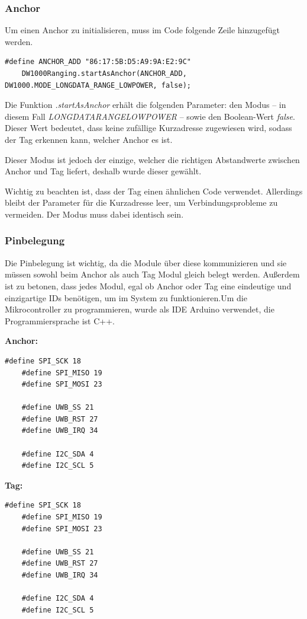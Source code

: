 \subsubsection{Anchor}

Um einen Anchor zu initialisieren, muss im Code folgende Zeile hinzugefügt werden.
\begin{lstlisting}[style=C++, caption=Anchor Initialisierung, captionpos=b]
	#define ANCHOR_ADD "86:17:5B:D5:A9:9A:E2:9C"
	DW1000Ranging.startAsAnchor(ANCHOR_ADD, DW1000.MODE_LONGDATA_RANGE_LOWPOWER, false);
\end{lstlisting} 

Die Funktion \textit{.startAsAnchor} erhält die folgenden Parameter: den Modus – in diesem Fall \textit{LONGDATA\textunderscore RANGE\textunderscore LOWPOWER} – sowie den Boolean-Wert \textit{false}. Dieser Wert bedeutet, dass keine zufällige Kurzadresse zugewiesen wird, sodass der Tag erkennen kann, welcher Anchor es ist.

Dieser Modus ist jedoch der einzige, welcher die richtigen Abstandwerte zwischen Anchor und Tag liefert, deshalb wurde dieser gewählt.

Wichtig zu beachten ist, dass der Tag einen ähnlichen Code verwendet. Allerdings bleibt der Parameter für die Kurzadresse leer, um Verbindungsprobleme zu vermeiden. Der Modus muss dabei identisch sein.

\newpage
\subsubsection{Pinbelegung}

Die Pinbelegung ist wichtig, da die Module über diese kommunizieren und sie müssen sowohl beim Anchor als auch Tag Modul gleich belegt werden. Außerdem ist zu betonen, dass jedes Modul, egal ob Anchor oder Tag eine eindeutige und einzigartige IDs benötigen, um im System zu funktionieren.Um die Mikrocontroller zu programmieren, wurde als IDE Arduino verwendet, die Programmiersprache ist C++.

\textbf{Anchor:}
\begin{lstlisting}[style=C++, caption=Pinbelegung für Anchor, captionpos=b]
	#define SPI_SCK 18
	#define SPI_MISO 19
	#define SPI_MOSI 23
	
	#define UWB_SS 21
	#define UWB_RST 27
	#define UWB_IRQ 34 
	
	#define I2C_SDA 4
	#define I2C_SCL 5
\end{lstlisting}


\textbf{Tag:}
\begin{lstlisting}[style=C++, caption=Pinbelegung für Tag, captionpos=b]
	#define SPI_SCK 18
	#define SPI_MISO 19
	#define SPI_MOSI 23
	
	#define UWB_SS 21
	#define UWB_RST 27
	#define UWB_IRQ 34 
	
	#define I2C_SDA 4
	#define I2C_SCL 5
\end{lstlisting}

